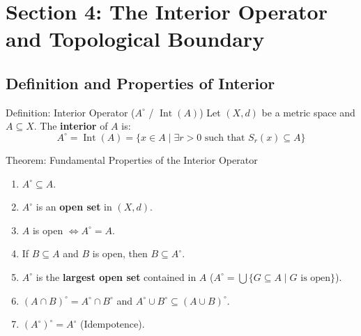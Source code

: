 \documentclass[11pt,a4paper]{article}
\begin{document}
\newpage

\section{Section 4: The Interior Operator and Topological Boundary}

\subsection{Definition and Properties of Interior}

\begin{defbox}{Definition: Interior Operator ($A^\circ$ / $\operatorname{Int}(A)$)}
Let $(X, d)$ be a metric space and $A \subseteq X$. The \textbf{interior} of $A$ is:
\begin{equation}
    A^\circ = \operatorname{Int}(A) = \{ x \in A \mid \exists r > 0 \text{ such that } S_r(x) \subseteq A \}
\end{equation}
\end{defbox}

\begin{formulabox}{Theorem: Fundamental Properties of the Interior Operator}
\begin{enumerate}
    \item[\textbf{(i)}] $A^\circ \subseteq A$.
    \item[\textbf{(ii)}] $A^\circ$ is an \textbf{open set} in $(X, d)$.
    \item[\textbf{(iii)}] $A$ is open $\iff A^\circ = A$.
    \item[\textbf{(iv)}] If $B \subseteq A$ and $B$ is open, then $B \subseteq A^\circ$.
    \item[\textbf{(v)}] $A^\circ$ is the \textbf{largest open set} contained in $A$ ($A^\circ = \bigcup \{G \subseteq A \mid G \text{ is open}\}$).
    \item[\textbf{(vi)}] $(A \cap B)^\circ = A^\circ \cap B^\circ$ and $A^\circ \cup B^\circ \subseteq (A \cup B)^\circ$.
    \item[\textbf{(vii)}] $(A^\circ)^\circ = A^\circ$ (Idempotence).
\end{enumerate}
\end{formulabox}
\end{document}
